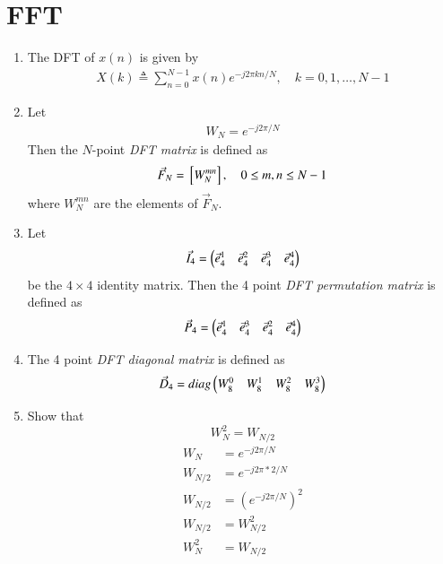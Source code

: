 \documentclass[journal,12pt,twocolumn]{IEEEtran}
\renewcommand\thesection{\arabic{section}}
\begin{document}
\section{FFT}
\begin{enumerate}[label=\thesection.\arabic*]
\item The DFT of $x(n)$ is given by
\begin{align}
	X(k) \triangleq \sum_{n=0}^{N-1} x(n) e^{-j 2 \pi k n / N}, \quad k=0,1, \ldots, N-1
\end{align}
\item Let 
\begin{align}
	W_{N} = e^{-j2\pi/N} 
\end{align}
Then the $N$-point {\em DFT matrix} is defined as 
\begin{align}
	\vec{F}_{N} = {}\left[W_{N}^{mn}\right], \quad 0 \le m,n \le N-1 
\end{align}
where $W_{N}^{mn}$ are the elements of $\vec{F}_{N}$.
\item Let 
\begin{align}
	\vec{I}_4 = \begin{pmatrix}\vec{e}_4^{1} &\vec{e}_4^{2} &\vec{e}_4^{3} &\vec{e}_4^{4} \end{pmatrix}
\end{align}
be the $4\times 4$ identity matrix.  Then the 4 point {\em DFT permutation matrix} is defined as 
\begin{align}
	\vec{P}_4 = \begin{pmatrix}\vec{e}_4^{1} &\vec{e}_4^{3} &\vec{e}_4^{2} &\vec{e}_4^{4} \end{pmatrix}
\end{align}
\item The 4 point {\em DFT diagonal matrix} is defined as 
\begin{align}
	\vec{D}_4 = diag\begin{pmatrix}W_{8}^{0} & W_{8}^{1} & W_{8}^{2} & W_{8}^{3}\end{pmatrix}
\end{align}
\item Show that 
\begin{equation}
	W_{N}^{2}=W_{N/2}
	\label{eq:n-2}
\end{equation}
\solution
\begin{align}
	W_{N} &= e^{-j2\pi/N}  \\
	W_{N/2} &= e^{-j2\pi*2/N} \\
	W_{N/2} &= \left(e^{-j2\pi/N}\right)^2 \\
	W_{N/2} &= W_{N/2}^2 \\
	W_{N}^{2} &= W_{N/2}
\end{align}

\end{enumerate}
\end{document}
